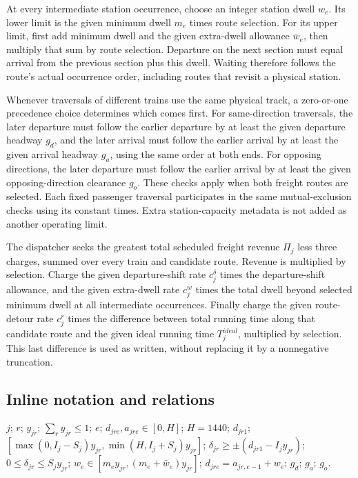 \documentclass[10pt]{article}
\begin{document}
At every intermediate station occurrence, choose an integer station dwell $w_e$. Its lower limit is the given minimum dwell $m_e$ times route selection. For its upper limit, first add minimum dwell and the given extra-dwell allowance $\bar w_e$, then multiply that sum by route selection. Departure on the next section must equal arrival from the previous section plus this dwell. Waiting therefore follows the route's actual occurrence order, including routes that revisit a physical station.

Whenever traversals of different trains use the same physical track, a zero-or-one precedence choice determines which comes first. For same-direction traversals, the later departure must follow the earlier departure by at least the given departure headway $g_d$, and the later arrival must follow the earlier arrival by at least the given arrival headway $g_a$, using the same order at both ends. For opposing directions, the later departure must follow the earlier arrival by at least the given opposing-direction clearance $g_o$. These checks apply when both freight routes are selected. Each fixed passenger traversal participates in the same mutual-exclusion checks using its constant times. Extra station-capacity metadata is not added as another operating limit.

The dispatcher seeks the greatest total scheduled freight revenue $\Pi_j$ less three charges, summed over every train and candidate route. Revenue is multiplied by selection. Charge the given departure-shift rate $c^\delta_j$ times the departure-shift allowance, and the given extra-dwell rate $c^w_j$ times the total dwell beyond selected minimum dwell at all intermediate occurrences. Finally charge the given route-detour rate $c^r_j$ times the difference between total running time along that candidate route and the given ideal running time $T_j^{ideal}$, multiplied by selection. This last difference is used as written, without replacing it by a nonnegative truncation.

\subsection*{Inline notation and relations}
$j$; $r$; $y_{jr}$; $\sum_ry_{jr}\le1$; $e$; $d_{jre},a_{jre}\in[0,H]$; $H=1440$; $d_{jr1}$; $[\max(0,I_j-S_j)y_{jr},\min(H,I_j+S_j)y_{jr}]$; $\delta_{jr}\ge\pm(d_{jr1}-I_jy_{jr})$; $0\le\delta_{jr}\le S_jy_{jr}$; $w_e\in[m_ey_{jr},(m_e+\bar w_e)y_{jr}]$; $d_{jre}=a_{jr,e-1}+w_e$; $g_d$; $g_a$; $g_o$.
\end{document}
